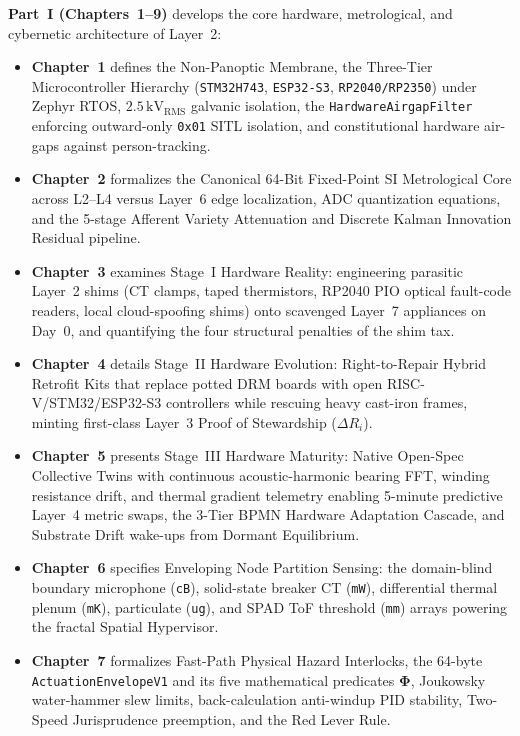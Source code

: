 \textbf{Part~I (Chapters~1--9)} develops the core hardware, metrological, and cybernetic architecture of Layer~2:
\begin{itemize}
    \item \textbf{Chapter~1} defines the Non-Panoptic Membrane, the Three-Tier Microcontroller Hierarchy (\texttt{STM32H743}, \texttt{ESP32-S3}, \texttt{RP2040/RP2350}) under Zephyr RTOS, $2.5\,\mathrm{kV}_{\mathrm{RMS}}$ galvanic isolation, the \texttt{HardwareAirgapFilter} enforcing outward-only \texttt{0x01} SITL isolation, and constitutional hardware air-gaps against person-tracking.
    \item \textbf{Chapter~2} formalizes the Canonical 64-Bit Fixed-Point SI Metrological Core across L2--L4 versus Layer~6 edge localization, ADC quantization equations, and the 5-stage Afferent Variety Attenuation and Discrete Kalman Innovation Residual pipeline.
    \item \textbf{Chapter~3} examines Stage~I Hardware Reality: engineering parasitic Layer~2 shims (CT clamps, taped thermistors, RP2040 PIO optical fault-code readers, local cloud-spoofing shims) onto scavenged Layer~7 appliances on Day~0, and quantifying the four structural penalties of the shim tax.
    \item \textbf{Chapter~4} details Stage~II Hardware Evolution: Right-to-Repair Hybrid Retrofit Kits that replace potted DRM boards with open RISC-V/STM32/ESP32-S3 controllers while rescuing heavy cast-iron frames, minting first-class Layer~3 Proof of Stewardship ($\Delta R_i$).
    \item \textbf{Chapter~5} presents Stage~III Hardware Maturity: Native Open-Spec Collective Twins with continuous acoustic-harmonic bearing FFT, winding resistance drift, and thermal gradient telemetry enabling 5-minute predictive Layer~4 metric swaps, the 3-Tier BPMN Hardware Adaptation Cascade, and Substrate Drift wake-ups from Dormant Equilibrium.
    \item \textbf{Chapter~6} specifies Enveloping Node Partition Sensing: the domain-blind boundary microphone (\texttt{cB}), solid-state breaker CT (\texttt{mW}), differential thermal plenum (\texttt{mK}), particulate (\texttt{ug}), and SPAD ToF threshold (\texttt{mm}) arrays powering the fractal Spatial Hypervisor.
    \item \textbf{Chapter~7} formalizes Fast-Path Physical Hazard Interlocks, the 64-byte \texttt{ActuationEnvelopeV1} and its five mathematical predicates $\mathbf{\Phi}$, Joukowsky water-hammer slew limits, back-calculation anti-windup PID stability, Two-Speed Jurisprudence preemption, and the Red Lever Rule.

\end{itemize}
